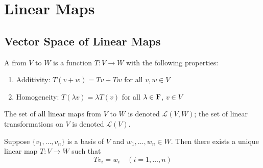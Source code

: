 \chapter{Linear Maps}\label{chap:linear-maps}
\section{Vector Space of Linear Maps}
\begin{definition}
A  from $V$ to $W$ is a function $T:V\to W$ with the following properties:
\begin{enumerate}[label=(\roman*)]
\item Additivity: $T(v+w)=Tv+Tw$ for all $v,w\in V$
\item Homogeneity: $T(\lambda v)=\lambda T(v)$ for all $\lambda\in\mathbf F$, $v\in V$
\end{enumerate}
\end{definition}

\begin{notation}
The set of all linear maps from $V$ to $W$ is denoted $\mathcal{L}(V,W)$; the set of linear transformations on $V$ is denoted $\mathcal{L}(V)$.
\end{notation}

\begin{lemma}
Suppose $\{v_1,\dots,v_n\}$ is a basis of $V$ and $w_1,\dots,w_n\in W$. Then there exists a unique linear map $T:V\to W$ such that
\[Tv_i=w_i\quad(i=1,\dots,n)\]
\end{lemma}

